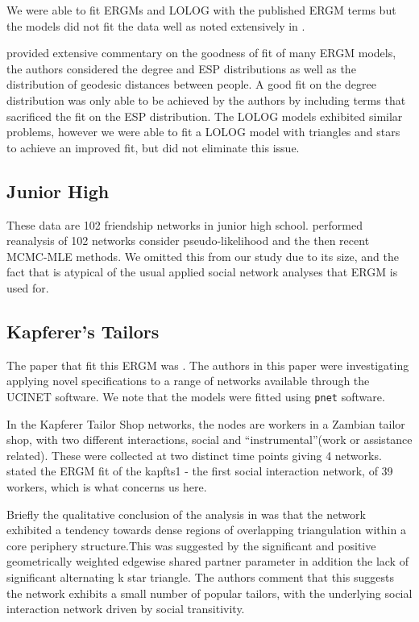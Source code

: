 \documentclass[
]{statsoc}
\begin{document}
We were able to fit ERGMs and LOLOG with the published ERGM terms but
the models did not fit the data well as noted extensively in
\cite{Goodreau2007}.

\cite{Goodreau2007} provided extensive commentary on the goodness of fit
of many ERGM models, the authors considered the degree and ESP
distributions as well as the distribution of geodesic distances between
people. A good fit on the degree distribution was only able to be
achieved by the authors by including terms that sacrificed the fit on
the ESP distribution. The LOLOG models exhibited similar problems,
however we were able to fit a LOLOG model with triangles and stars to
achieve an improved fit, but did not eliminate this issue.

\subsection{Junior High}

These data are 102 friendship networks in junior high school.
\cite{Lubbers2007} performed reanalysis of 102 networks consider
pseudo-likelihood and the then recent MCMC-MLE methods. We omitted this
from our study due to its size, and the fact that is atypical of the
usual applied social network analyses that ERGM is used for.

\subsection{Kapferer's Tailors}

The paper that fit this ERGM was \cite{Robins2007}. The authors in this
paper were investigating applying novel specifications to a range of
networks available through the UCINET software. We note that the models
were fitted using \texttt{pnet} software.

In the Kapferer Tailor Shop networks, the nodes are workers in a Zambian
tailor shop, with two different interactions, social and
``instrumental''(work or assistance related). These were collected at
two distinct time points giving 4 networks. \cite{Robins2007} stated the
ERGM fit of the kapfts1 - the first social interaction network, of 39
workers, which is what concerns us here.

Briefly the qualitative conclusion of the analysis in \cite{Robins2007}
was that the network exhibited a tendency towards dense regions of
overlapping triangulation within a core periphery structure.This was
suggested by the significant and positive geometrically weighted
edgewise shared partner parameter in addition the lack of significant
alternating k star triangle. The authors comment that this suggests the
network exhibits a small number of popular tailors, with the underlying
social interaction network driven by social transitivity.
\end{document}
